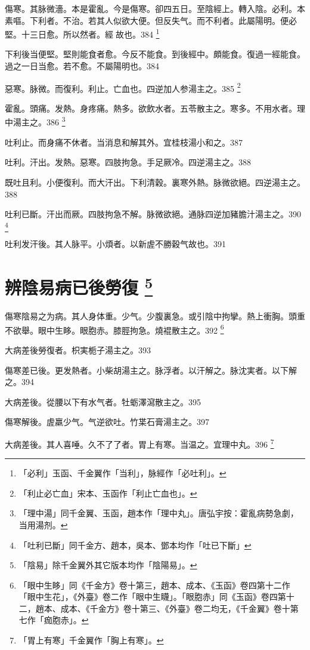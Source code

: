 傷寒。其脉微濇。本是霍亂。今是傷寒。卻四五日。至陰經上。轉入陰。必利。本素嘔。下利者。不治。若其人似欲大便。但反失气。而不利者。此屬陽明。便必堅。十三日愈。所以然者。經{\sungtpii 𥁞}故也。384
	\footnote{
	「必利」玉函、千金翼作「当利」，脉經作「必吐利」。
	}

下利後当便堅。堅則能食者愈。今反不能食。到後經中。頗能食。復過一經能食。過之一日当愈。若不愈。不屬陽明也。384

惡寒。脉微。而復利。利止。亡血也。四逆加人参湯主之。385
	\footnote{
	「利止必亡血」宋本、玉函作「利止亡血也」。
	}

霍亂。頭痛。发熱。身疼痛。熱多。欲飲水者。五苓散主之。寒多。不用水者。理中湯主之。386
	\footnote{
	「理中湯」同千金翼、玉函，趙本作「理中丸」。唐弘宇按：霍亂病勢急劇，当用湯剂。
	}

吐利止。而身痛不休者。当消息和解其外。宜桂枝湯小和之。387

吐利。汗出。发熱。惡寒。四肢拘急。手足厥冷。四逆湯主之。388

既吐且利。小便復利。而大汗出。下利清穀。裏寒外熱。脉微欲絕。四逆湯主之。388

吐利已斷。汗出而厥。四肢拘急不解。脉微欲絕。通脉四逆加豬膽汁湯主之。390
	\footnote{
	「吐利已斷」同千金方、趙本，吳本、鄧本均作「吐已下斷」
	}

吐利发汗後。其人脉平。小煩者。以新虗不勝穀气故也。391

\chapter{辨陰易病已後勞復
	\footnote{
	「陰易」除千金翼外其它版本均作「陰陽易」。
	}
}

傷寒陰易之为病。其人身体重。少气。少腹裏急。或引陰中拘攣。熱上衝胸。頭重不欲舉。眼中生眵。{\khaaitp 眼胞赤。}膝脛拘急。燒裩散主之。392
	\footnote{
		「眼中生眵」同《千金方》卷十第三，趙本、成本、《玉函》卷四第十二作「眼中生花」，《外臺》卷二作「眼中生䁾」。「眼胞赤」同《玉函》卷四第十二，趙本、成本、《千金方》卷十第三、《外臺》卷二均无，《千金翼》卷十第七作「痂胞赤」。
	}

大病差後勞復者。枳実栀子湯主之。393

傷寒差已後。更发熱者。小柴胡湯主之。脉浮者。以汗解之。脉沈実者。以下解之。394

大病差後。從腰以下有水气者。牡蛎澤瀉散主之。395

傷寒解後。虗羸少气。气逆欲吐。竹枼石膏湯主之。397

大病差後。其人喜唾。久不了了者。胃上有寒。当温之。宜理中丸。396
	\footnote{
	「胃上有寒」千金翼作「胸上有寒」。
	}


